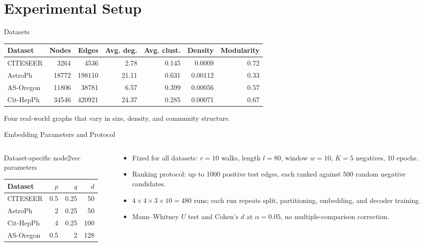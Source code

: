 \documentclass[aspectratio=169]{beamer}
\begin{document}
\section{Experimental Setup}

\begin{frame}{Datasets}
  \footnotesize
  \begin{tabular}{lrrrrrr}
    \toprule
    Dataset & Nodes & Edges & Avg. deg. & Avg. clust. & Density & Modularity \\
    \midrule
    CITESEER  & 3264  & 4536   & 2.78  & 0.145 & 0.0009  & 0.72 \\
    AstroPh   & 18772 & 198110 & 21.11 & 0.631 & 0.00112 & 0.33 \\
    AS-Oregon & 11806 & 38781  & 6.57  & 0.399 & 0.00056 & 0.57 \\
    Cit-HepPh & 34546 & 420921 & 24.37 & 0.285 & 0.00071 & 0.67 \\
    \bottomrule
  \end{tabular}
  \vspace{1em}

  Four real-world graphs that vary in size, density, and community structure.
\end{frame}

\begin{frame}{Embedding Parameters and Protocol}
  \begin{columns}
    \begin{column}{0.48\textwidth}
      \centering
      \small Dataset-specific node2vec parameters
      \begin{tabular}{lrrr}
        \toprule
        Dataset & $p$ & $q$ & $d$ \\
        \midrule
        CITESEER  & 0.5 & 0.25 & 50 \\
        AstroPh   & 2   & 0.25 & 50 \\
        Cit-HepPh & 4   & 0.25 & 100 \\
        AS-Oregon & 0.5 & 2    & 128 \\
        \bottomrule
      \end{tabular}
    \end{column}
    \begin{column}{0.48\textwidth}
      \footnotesize
      \begin{itemize}
        \item Fixed for all datasets: $r=10$ walks, length $l=80$, window $w=10$, $K=5$ negatives, 10 epochs.
        \item Ranking protocol: up to 1000 positive test edges, each ranked against 500 random negative candidates.
        \item $4 \times 4 \times 3 \times 10 = 480$ runs; each run repeats split, partitioning, embedding, and decoder training.
        \item Mann--Whitney $U$ test and Cohen's $d$ at $\alpha = 0.05$, no multiple-comparison correction.
      \end{itemize}
    \end{column}
  \end{columns}
\end{frame}
\end{document}
